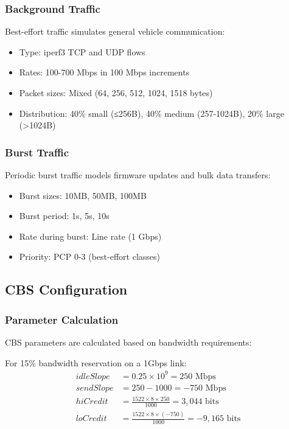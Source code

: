 \documentclass[10pt, journal, compsoc]{IEEEtran}
\begin{document}
\subsubsection{Background Traffic}

Best-effort traffic simulates general vehicle communication:

\begin{itemize}
    \item Type: iperf3 TCP and UDP flows
    \item Rates: 100-700 Mbps in 100 Mbps increments
    \item Packet sizes: Mixed (64, 256, 512, 1024, 1518 bytes)
    \item Distribution: 40\% small (≤256B), 40\% medium (257-1024B), 20\% large (>1024B)
\end{itemize}

\subsubsection{Burst Traffic}

Periodic burst traffic models firmware updates and bulk data transfers:

\begin{itemize}
    \item Burst sizes: 10MB, 50MB, 100MB
    \item Burst period: 1s, 5s, 10s
    \item Rate during burst: Line rate (1 Gbps)
    \item Priority: PCP 0-3 (best-effort classes)
\end{itemize}

\subsection{CBS Configuration}

\subsubsection{Parameter Calculation}

CBS parameters are calculated based on bandwidth requirements:

For 15\% bandwidth reservation on a 1Gbps link:
\begin{align}
idleSlope &= 0.25 \times 10^9 = 250 \text{ Mbps} \\
sendSlope &= 250 - 1000 = -750 \text{ Mbps} \\
hiCredit &= \frac{1522 \times 8 \times 250}{1000} = 3,044 \text{ bits} \\
loCredit &= \frac{1522 \times 8 \times (-750)}{1000} = -9,165 \text{ bits}
\end{align}
\end{document}

